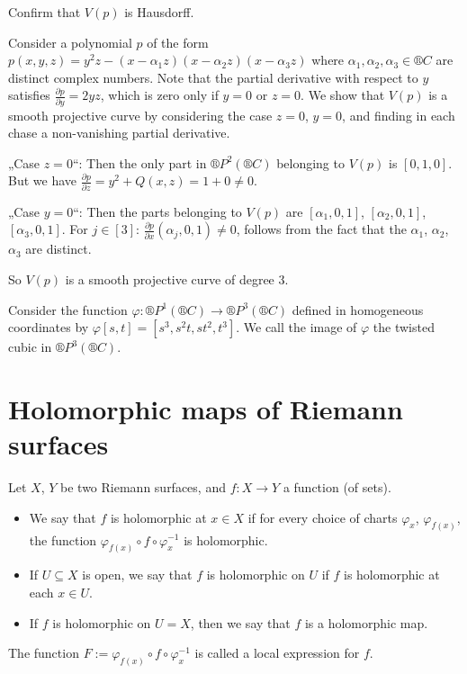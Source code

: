 \documentclass[12pt]{article}					%
\begin{document}
\begin{priklad}
	Confirm that $V(p)$ is Hausdorff.
\end{priklad}

\begin{priklady}
	Consider a polynomial $p$ of the form $p(x, y, z) = y^2z - (x - α_1z)(x - α_2z)(x - α_3z)$ where $α_1, α_2, α_3 \in ®C$ are distinct complex numbers. Note that the partial derivative with respect to $y$ satisfies $\frac{\partial p}{\partial y} = 2yz$, which is zero only if $y = 0$ or $z = 0$. We show that $V(p)$ is a smooth projective curve by considering the case $z = 0$, $y = 0$, and finding in each chase a non-vanishing partial derivative.

	„Case $z = 0$“: Then the only part in $®P^2(®C)$ belonging to $V(p)$ is $[0, 1, 0]$. But we have $\frac{\partial p}{\partial z} = y^2 + Q(x, z) = 1 + 0 ≠ 0$.

	„Case $y = 0$“: Then the parts belonging to $V(p)$ are $[α_1, 0, 1]$, $[α_2, 0, 1]$, $[α_3, 0, 1]$. For $j \in [3]$: $\frac{\partial p}{\partial x}(α_j, 0, 1) ≠ 0$, follows from the fact that the $α_1$, $α_2$, $α_3$ are distinct.

	So $V(p)$ is a smooth projective curve of degree 3.
\end{priklady}

\begin{priklady}
	Consider the function $φ: ®P^1(®C) \rightarrow ®P^3(®C)$ defined in homogeneous coordinates by $φ[s, t] = [s^3, s^2t, st^2, t^3]$. We call the image of $φ$ the twisted cubic in $®P^3(®C)$.
\end{priklady}


\section{Holomorphic maps of Riemann surfaces}
\begin{definice}
	Let $X$, $Y$ be two Riemann surfaces, and $f: X \rightarrow Y$ a function (of sets).

	\begin{itemize}
		\item We say that $f$ is holomorphic at $x \in X$ if for every choice of charts $φ_x$, $φ_{f(x)}$, the function $φ_{f(x)} ∘ f ∘ φ_x^{-1}$ is holomorphic.
		\item If $U \subseteq X$ is open, we say that $f$ is holomorphic on $U$ if $f$ is holomorphic at each $x \in U$.
		\item If $f$ is holomorphic on $U = X$, then we say that $f$ is a holomorphic map.
	\end{itemize}

	The function $F := φ_{f(x)} ∘ f ∘ φ_x^{-1}$ is called a local expression for $f$.
\end{definice}
\end{document}
